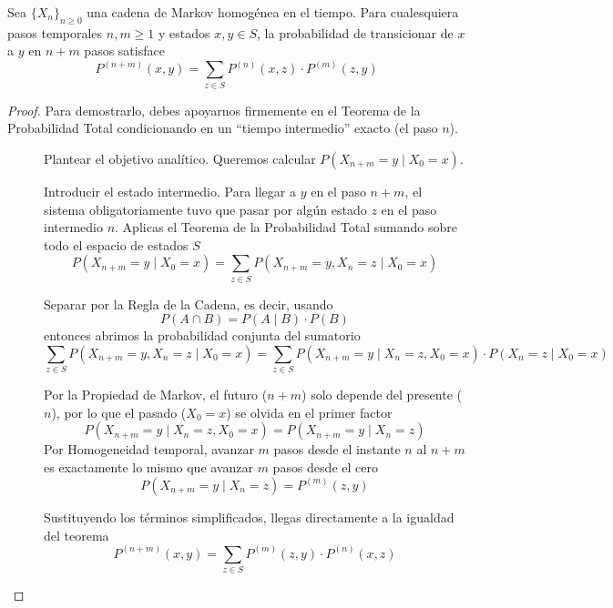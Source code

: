 \begin{teo}
    Sea $\{X_n\}_{n \ge 0}$ una cadena de Markov homogénea en el tiempo. Para cualesquiera pasos temporales $n, m \ge 1$ y estados $x, y \in S$, la probabilidad de transicionar de $x$ a $y$ en $n+m$ pasos satisface
    $$P^{(n+m)}(x, y) = \sum_{z \in S} P^{(n)}(x, z) \cdot P^{(m)}(z, y)$$
\begin{proof}
    Para demostrarlo, debes apoyarnos firmemente en el Teorema de la Probabilidad Total condicionando en un ``tiempo intermedio'' exacto (el paso $n$).
    \begin{description}
        \item[] Plantear el objetivo analítico. Queremos calcular $P(X_{n+m} = y \mid X_0 = x)$.
        \item[] Introducir el estado intermedio. Para llegar a $y$ en el paso $n+m$, el sistema obligatoriamente tuvo que pasar por algún estado $z$ en el paso intermedio $n$. Aplicas el Teorema de la Probabilidad Total sumando sobre todo el espacio de estados $S$
        $$P(X_{n+m} = y \mid X_0 = x) = \sum_{z \in S} P(X_{n+m} = y, X_n = z \mid X_0 = x)$$
        \item[] Separar por la Regla de la Cadena, es decir, usando
        \begin{equation*}
            P(A\cap B) = P(A \mid B) \cdot P(B )
        \end{equation*}
        entonces abrimos la probabilidad conjunta del sumatorio
        $$\sum_{z \in S} P(X_{n+m} = y, X_n = z \mid X_0 = x)= \sum_{z \in S} P(X_{n+m} = y \mid X_n = z, X_0 = x) \cdot P(X_n = z \mid X_0 = x)$$
        \item[] Por la Propiedad de Markov, el futuro ($n+m$) solo depende del presente ($n$), por lo que el pasado ($X_0 = x$) se olvida en el primer factor
        $$P(X_{n+m} = y \mid X_n = z, X_0 = x) = P(X_{n+m} = y \mid X_n = z)$$
        Por Homogeneidad temporal, avanzar $m$ pasos desde el instante $n$ al $n+m$ es exactamente lo mismo que avanzar $m$ pasos desde el cero
        $$P(X_{n+m} = y \mid X_n = z) = P^{(m)}(z, y)$$
        \item[] Sustituyendo los términos simplificados, llegas directamente a la igualdad del teorema
        $$P^{(n+m)}(x, y) = \sum_{z \in S} P^{(m)}(z, y) \cdot P^{(n)}(x, z)$$
    \end{description}
\end{proof}
\end{teo}

